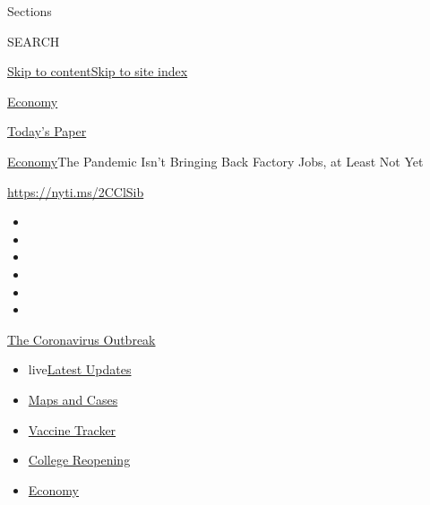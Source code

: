 Sections

SEARCH

\protect\hyperlink{site-content}{Skip to
content}\protect\hyperlink{site-index}{Skip to site index}

\href{https://www.nytimes.com/section/business/economy}{Economy}

\href{https://myaccount.nytimes.com/auth/login?response_type=cookie\&client_id=vi}{}

\href{https://www.nytimes.com/section/todayspaper}{Today's Paper}

\href{/section/business/economy}{Economy}\textbar{}The Pandemic Isn't
Bringing Back Factory Jobs, at Least Not Yet

\url{https://nyti.ms/2CClSib}

\begin{itemize}
\item
\item
\item
\item
\item
\item
\end{itemize}

\href{https://www.nytimes.com/news-event/coronavirus?action=click\&pgtype=Article\&state=default\&region=TOP_BANNER\&context=storylines_menu}{The
Coronavirus Outbreak}

\begin{itemize}
\tightlist
\item
  live\href{https://www.nytimes.com/2020/08/04/world/coronavirus-covid-19.html?action=click\&pgtype=Article\&state=default\&region=TOP_BANNER\&context=storylines_menu}{Latest
  Updates}
\item
  \href{https://www.nytimes.com/interactive/2020/us/coronavirus-us-cases.html?action=click\&pgtype=Article\&state=default\&region=TOP_BANNER\&context=storylines_menu}{Maps
  and Cases}
\item
  \href{https://www.nytimes.com/interactive/2020/science/coronavirus-vaccine-tracker.html?action=click\&pgtype=Article\&state=default\&region=TOP_BANNER\&context=storylines_menu}{Vaccine
  Tracker}
\item
  \href{https://www.nytimes.com/2020/08/02/us/covid-college-reopening.html?action=click\&pgtype=Article\&state=default\&region=TOP_BANNER\&context=storylines_menu}{College
  Reopening}
\item
  \href{https://www.nytimes.com/live/2020/08/03/business/stock-market-today-coronavirus?action=click\&pgtype=Article\&state=default\&region=TOP_BANNER\&context=storylines_menu}{Economy}
\end{itemize}

